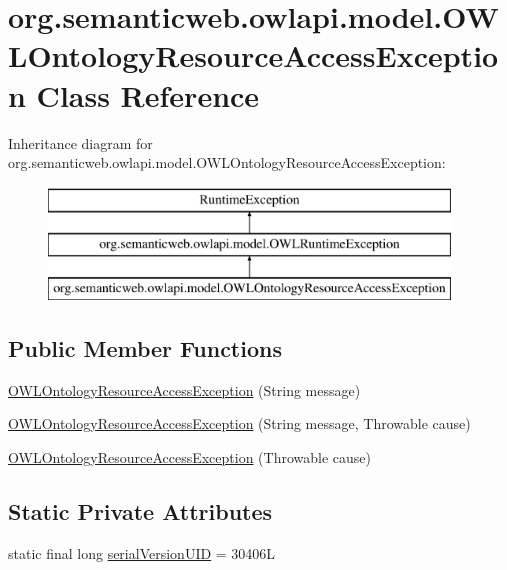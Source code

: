 \hypertarget{classorg_1_1semanticweb_1_1owlapi_1_1model_1_1_o_w_l_ontology_resource_access_exception}{\section{org.\-semanticweb.\-owlapi.\-model.\-O\-W\-L\-Ontology\-Resource\-Access\-Exception Class Reference}
\label{classorg_1_1semanticweb_1_1owlapi_1_1model_1_1_o_w_l_ontology_resource_access_exception}
}
Inheritance diagram for org.\-semanticweb.\-owlapi.\-model.\-O\-W\-L\-Ontology\-Resource\-Access\-Exception\-:\begin{figure}[H]
\begin{center}
\leavevmode
\includegraphics[height=3.000000cm]{classorg_1_1semanticweb_1_1owlapi_1_1model_1_1_o_w_l_ontology_resource_access_exception}
\end{center}
\end{figure}
\subsection*{Public Member Functions}
\begin{DoxyCompactItemize}
\item 
\hyperlink{classorg_1_1semanticweb_1_1owlapi_1_1model_1_1_o_w_l_ontology_resource_access_exception_a95976096b213e6b87779a543eeb2acfd}{O\-W\-L\-Ontology\-Resource\-Access\-Exception} (String message)
\item 
\hyperlink{classorg_1_1semanticweb_1_1owlapi_1_1model_1_1_o_w_l_ontology_resource_access_exception_adae3d7cdb2b78a1bcdaba59619de62f4}{O\-W\-L\-Ontology\-Resource\-Access\-Exception} (String message, Throwable cause)
\item 
\hyperlink{classorg_1_1semanticweb_1_1owlapi_1_1model_1_1_o_w_l_ontology_resource_access_exception_a1864b22ab22d51cc51193c38d9e99097}{O\-W\-L\-Ontology\-Resource\-Access\-Exception} (Throwable cause)
\end{DoxyCompactItemize}
\subsection*{Static Private Attributes}
\begin{DoxyCompactItemize}
\item 
static final long \hyperlink{classorg_1_1semanticweb_1_1owlapi_1_1model_1_1_o_w_l_ontology_resource_access_exception_abce1aade3ec76a0ec7164f75af3d221c}{serial\-Version\-U\-I\-D} = 30406\-L
\end{DoxyCompactItemize}


